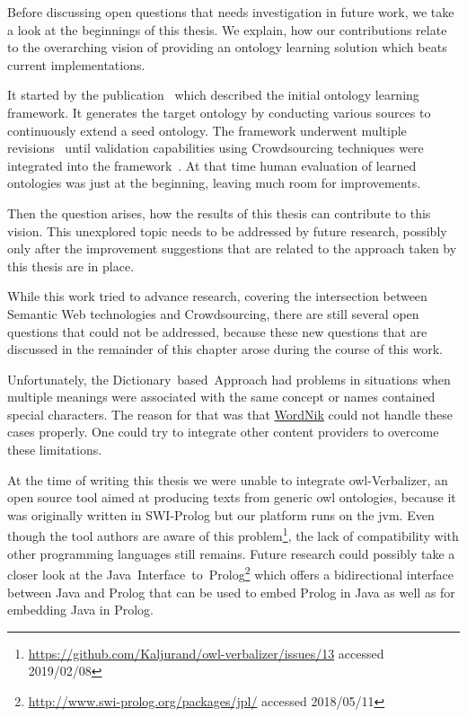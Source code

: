 Before discussing open questions that needs investigation in future work, we take a look at the beginnings of this thesis. We explain, how our contributions relate to the overarching vision of providing an ontology learning solution which beats current implementations. 

It started by the publication~\cite{liu2005semi} which described the initial ontology learning framework. It generates the target ontology by conducting various sources to continuously extend a seed ontology. The framework underwent multiple revisions~\cite{weichselbraun2010_a, weichselbraun2010_b} until validation capabilities using Crowdsourcing techniques were integrated into the framework~\cite{wohlgenannt2012}.  
At that time human evaluation of learned ontologies was just at the beginning, leaving much room for improvements. 

Then the question arises, how the results of this thesis can contribute to this vision. This unexplored topic needs to be addressed by future research, possibly only after the improvement suggestions that are related to the approach taken by this thesis are in place. 

While this work tried to advance research, covering the intersection between Semantic Web technologies and Crowdsourcing, there are still several open questions that could not be addressed, because these new questions that are discussed in the remainder of this chapter arose during the course of this work.

Unfortunately, the Dictionary~based~Approach had problems in situations when multiple meanings were associated with the same concept or names contained special characters. The reason for that was that \hyperref[sec:wordnik]{WordNik} could not handle these cases properly. One could try to integrate other content providers to overcome these limitations. 

At the time of writing this thesis we were unable to integrate \gls{owl}-Verbalizer, an open source tool aimed at producing texts from generic \gls{owl} ontologies, because it was originally written in SWI-Prolog but our platform runs on the \gls{jvm}. Even though the tool authors are aware of this problem\footnote{\url{https://github.com/Kaljurand/owl-verbalizer/issues/13} accessed 2019/02/08}, the lack of compatibility with other programming languages still remains. Future research could possibly take a closer look at the Java~Interface~to~Prolog\footnote{\url{http://www.swi-prolog.org/packages/jpl/} accessed 2018/05/11} which offers a bidirectional interface between Java and Prolog that can be used to embed Prolog in Java as well as for embedding Java in Prolog. 

